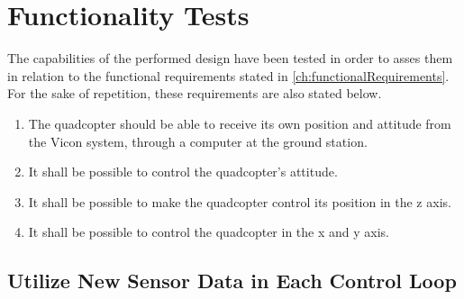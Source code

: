\chapter{Functionality Tests}
The capabilities of the performed design have been tested in order to asses them in relation to the functional requirements stated in \autoref{ch:functionalRequirements}. 
For the sake of repetition, these requirements are also stated below.
\begin{enumerate}[label=\textbf{\arabic*})]
\item {The quadcopter should be able to receive its own position and attitude from the Vicon system, through a computer at the ground station.}
\item {It shall be possible to control the quadcopter's attitude.}
\item {It shall be possible to make the quadcopter control its position in the z axis.}
\item {It shall be possible to control the quadcopter in the x and y axis.}
\end{enumerate}

\section{Utilize New Sensor Data in Each Control Loop}


